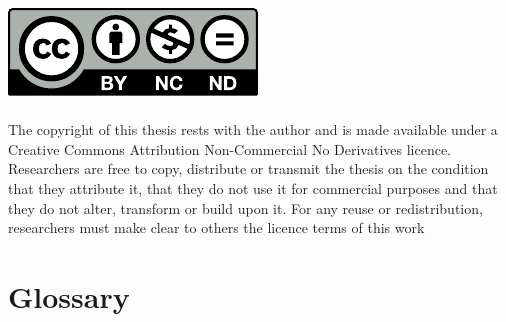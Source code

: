 \documentclass[12pt,a4paper,oneside,fleqn,openright]{book}
\begin{document}

\includegraphics{9_backmatter/doclicense-CC-by-nc-nd.pdf}\\
\doclicenseLongText\\

The copyright of this thesis rests with the author and is made available under a
Creative Commons Attribution Non-Commercial  No Derivatives licence. Researchers
are free to copy,  distribute or transmit the thesis on  the condition that they
attribute it, that they  do not use it for commercial purposes  and that they do
not  alter,  transform or  build  upon  it.  For  any reuse  or  redistribution,
researchers must make clear to others the licence terms of this work

{} %
\tableofcontents            %

\cleardoublepage
\listoffigures	%
\cleardoublepage
\listoftables  %
\cleardoublepage
\listofalgorithms
{}
\cleardoublepage
{} %
\cleardoublepage
{} %


\cleardoublepage

\chapter{Glossary}\label{ch:glossary}
\begin{multicols}{2} %
    \begin{footnotesize} %
        \printglossary{}
        \label{nom} %
    \end{footnotesize}
\end{multicols}
\end{document}
